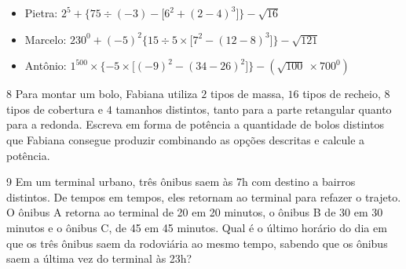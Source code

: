 \begin{itemize}
\item Pietra:
$2^{5} + \{ 75 \div ( - 3 ) - \lbrack 6^{2} + ( 2 - 4 )^{3} \rbrack \} - \sqrt{16}$

\item Marcelo:
$230^{0} + ( - 5)^2 \{ 15 \div 5 \times \lbrack 7^{2} - ( 12 - 8 )^{3} \rbrack \} - \sqrt{121}$

\item Antônio:
$1^{500} \times \{ - 5 \times \lbrack ( - 9 )^{2} - ( 34 - 26 )^{2} \rbrack \} - (\sqrt{100}\  \times 700^{0})$
\end{itemize}



\num{8} Para montar um bolo, Fabiana utiliza $2$ tipos de massa, $16$ tipos de
recheio, $8$ tipos de cobertura e $4$ tamanhos distintos, tanto para a parte
retangular quanto para a redonda. Escreva em forma de potência a
quantidade de bolos distintos que Fabiana consegue produzir combinando
as opções descritas e calcule a potência.




\num{9} Em um terminal urbano, três ônibus saem às 7h com destino a bairros
distintos. De tempos em tempos, eles retornam ao terminal para refazer o
trajeto. O ônibus A retorna ao terminal de 20 em 20 minutos, o ônibus B
de 30 em 30 minutos e o ônibus C, de 45 em 45 minutos. Qual é o último
horário do dia em que os três ônibus saem da rodoviária ao mesmo tempo,
sabendo que os ônibus saem a última vez do terminal às 23h?

